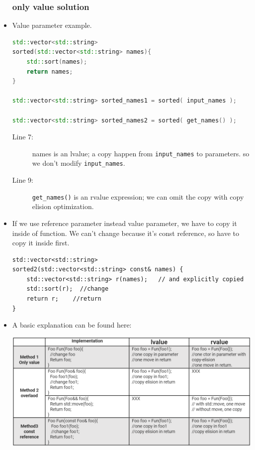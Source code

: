 \documentclass[a4paper,11pt,twoside]{book}
\begin{document}
\begin{itemize}
\subsubsection{only value solution}

    \item Value parameter example.

\begin{lstlisting}[frame=single, language=c++]
std::vector<std::string> 
sorted(std::vector<std::string> names){
	std::sort(names);
	return names;
}

std::vector<std::string> sorted_names1 = sorted( input_names );

std::vector<std::string> sorted_names2 = sorted( get_names() );
\end{lstlisting}
\begin{description}
	\item[Line 7:] names is an lvalue; a copy happen from \texttt{input\_names} to parameters. so we don't modify \texttt{input\_names}.

	\item[Line 9:] \texttt{get\_names()} is an rvalue expression; we can omit the copy with copy elision optimization.

\end{description}

    \item If we use reference parameter instead value parameter, we have to copy it inside of function. We can't change because it's const reference, so have to copy it inside first. 

\begin{lstlisting}[numbers=none]
std::vector<std::string> 
sorted2(std::vector<std::string> const& names) {
	std::vector<std::string> r(names);   // and explicitly copied
	std::sort(r);  //change
	return r;    //return
}
\end{lstlisting}



\item A basic explanation can be found here: \\
\begin{center}
	\includegraphics[scale=0.5]{pics/copy1.png}
\end{center}


\end{itemize}
\end{document}
